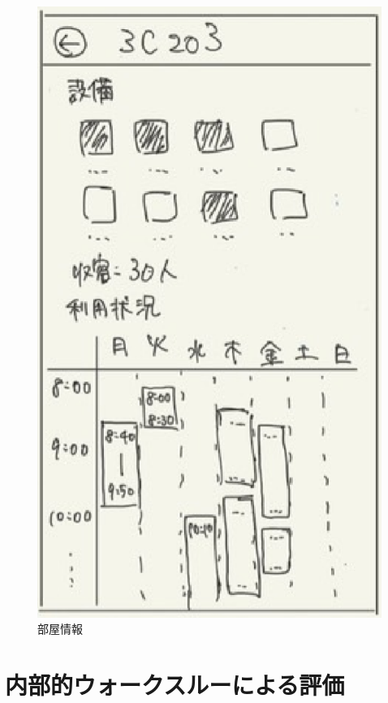 \documentclass[12pt,a4paper,dvipdf]{jsarticle}
\begin{document}
\begin{figure}[H]
\begin{minipage}[b]{0.24\columnwidth}
        \includegraphics[width=0.9\columnwidth]{./img/部屋情報.png}
        \caption{部屋情報}
    \end{minipage}
\end{figure}



\section{内部的ウォークスルーによる評価}
\end{document}
